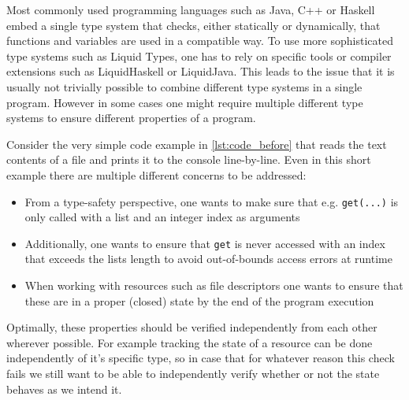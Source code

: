 \documentclass{easychair}
\begin{document}
\label{sec:challenges-in-type-systems}
Most commonly used programming languages such as Java, C++ or Haskell embed a single type system that checks, either statically or dynamically, that functions and variables are used in a compatible way. To use more sophisticated type systems such as Liquid Types, one has to rely on specific tools or compiler extensions such as LiquidHaskell\cite{LiquidHaskell} or LiquidJava\cite{LiquidJava}. This leads to the issue that it is usually not trivially possible to combine different type systems in a single program. However in some cases one might require multiple different type systems to ensure different properties of a program.

Consider the very simple code example in \autoref{lst:code_before} that reads the text contents of a file and prints it to the console line-by-line. Even in this short example there are multiple different concerns to be addressed:
\begin{itemize}
	\item From a type-safety perspective, one wants to make sure that e.g. \texttt{get(...)} is only called with a list and an integer index as arguments
	\item Additionally, one wants to ensure that \texttt{get} is never accessed with an index that exceeds the lists length to avoid out-of-bounds access errors at runtime
	\item When working with resources such as file descriptors one wants to ensure that these are in a proper (closed) state by the end of the program execution
\end{itemize}
Optimally, these properties should be verified independently from each other wherever possible. For example tracking the state of a resource can be done independently of it's specific type, so in case that for whatever reason this check fails we still want to be able to independently verify whether or not the state behaves as we intend it.
\end{document}
